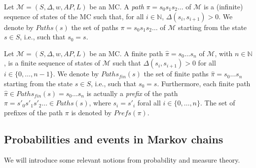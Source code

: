 \begin{definition} Let $\mathcal{M} = (S, \Delta, w, AP, L)$ be an MC.
A \textit{path} $\pi = s_0 s_1 s_2 \dots$ of $\mathcal{M}$ is a (infinite) sequence of states of the MC such that, for all $i \in \mathbb{N}$, $\Delta(s_i, s_{i+1})> 0$. We denote by $Paths(s)$ the set of paths $\pi = s_0s_1s_2\dots$ of $\mathcal{M}$ starting from the state $s \in S$, i.e., such that $s_0 = s$.
\end{definition}
\begin{definition}
Let $\mathcal{M} = (S, \Delta, w, AP, L)$ be an MC.
A finite path $\hat{\pi} = s_0 \dots s_n$ of $\mathcal{M}$, with $n \in \mathbb{N}$, is a finite sequence of states of $\mathcal{M}$ such that $\Delta(s_i, s_{i+1}) > 0$ for all $i \in \{0, \dots, n-1\}$.
We denote by $Paths_{fin}(s)$ the set of finite paths $\hat{\pi} = s_0 \dots s_n$ starting from the state $s \in S$, i.e., such that $s_0 = s$. Furthermore, each finite path $\hat{\pi}\in Paths_{fin}(s) = s_0\dots s_n$ is actually a \textit{prefix} of the path
$\pi = s'_0s'_1s'_2 \dots \in Paths(s)$, where $s_i = s'_i$ foral all $i \in \{0, \dots, n\}$. The set of prefixes of the path $\pi$ is denoted by $Prefs(\pi)$.
\end{definition}

\subsection{Probabilities and events in Markov chains}
We will introduce some relevant notions from probability and measure theory.


